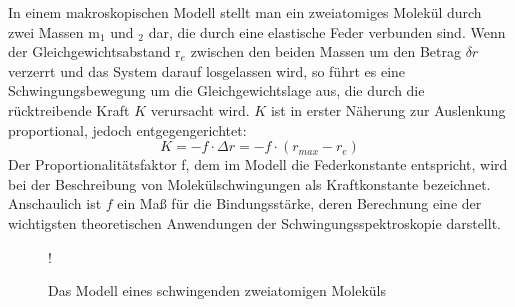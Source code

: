 \documentclass{article}
\begin{document}
In einem makroskopischen Modell stellt man ein zweiatomiges Molekül
durch zwei Massen m$_1$ und $_2$ dar, die durch eine elastische Feder verbunden sind.
Wenn der Gleichgewichtsabstand r$_e$ zwischen den beiden Massen um den Betrag $\delta r$
verzerrt und das System darauf losgelassen wird, so führt es eine Schwingungsbewegung
um die Gleichgewichtslage aus, die durch die rücktreibende Kraft $K$ verursacht wird. $K$
ist in erster Näherung zur Auslenkung proportional, jedoch entgegengerichtet:
\begin{equation}\label{eq:harmonisch}
K = - f \cdot \Delta r = -f \cdot (r_{max} -r_e)
\end{equation}
Der Proportionalitätsfaktor f, dem im Modell die Federkonstante entspricht,
wird bei der Beschreibung von Molekülschwingungen als Kraftkonstante bezeichnet.
Anschaulich ist $f$ ein Maß für die Bindungsstärke, deren Berechnung eine der wichtigsten
theoretischen Anwendungen der Schwingungsspektroskopie darstellt.
\begin{figure}
\centering
\resizebox {.6\linewidth} {!} {
}
\caption{Das Modell eines schwingenden zweiatomigen Moleküls} \label{fig:M1}
\end{figure}
\end{document}
